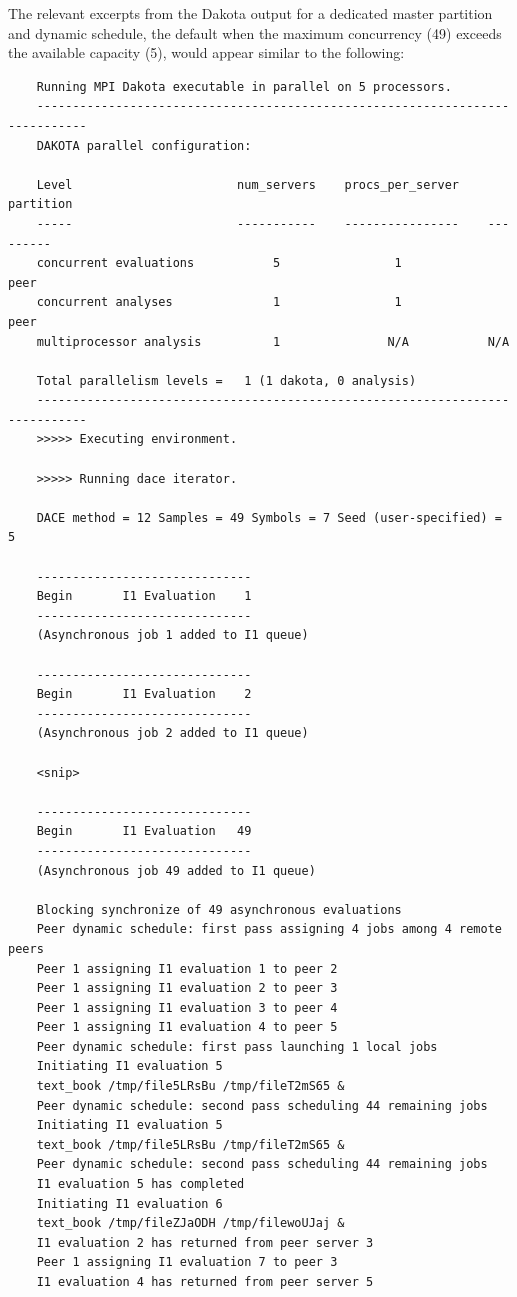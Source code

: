The relevant excerpts from the Dakota output for a dedicated master
partition and dynamic schedule, the default when the maximum concurrency
(49) exceeds the available capacity (5), would appear similar to the
following:
\begin{small}
\begin{verbatim}
    Running MPI Dakota executable in parallel on 5 processors.
    -----------------------------------------------------------------------------
    DAKOTA parallel configuration:
    
    Level                       num_servers    procs_per_server    partition
    -----                       -----------    ----------------    ---------
    concurrent evaluations           5                1            peer
    concurrent analyses	             1                1            peer
    multiprocessor analysis          1               N/A           N/A
    
    Total parallelism levels =   1 (1 dakota, 0 analysis)
    -----------------------------------------------------------------------------
    >>>>> Executing environment.
    
    >>>>> Running dace iterator.
    
    DACE method = 12 Samples = 49 Symbols = 7 Seed (user-specified) = 5
    
    ------------------------------
    Begin       I1 Evaluation    1
    ------------------------------
    (Asynchronous job 1 added to I1 queue)
    
    ------------------------------
    Begin       I1 Evaluation    2
    ------------------------------
    (Asynchronous job 2 added to I1 queue)
    
    <snip>
    
    ------------------------------
    Begin       I1 Evaluation   49
    ------------------------------
    (Asynchronous job 49 added to I1 queue)
    
    Blocking synchronize of 49 asynchronous evaluations
    Peer dynamic schedule: first pass assigning 4 jobs among 4 remote peers
    Peer 1 assigning I1 evaluation 1 to peer 2
    Peer 1 assigning I1 evaluation 2 to peer 3
    Peer 1 assigning I1 evaluation 3 to peer 4
    Peer 1 assigning I1 evaluation 4 to peer 5
    Peer dynamic schedule: first pass launching 1 local jobs
    Initiating I1 evaluation 5
    text_book /tmp/file5LRsBu /tmp/fileT2mS65 &
    Peer dynamic schedule: second pass scheduling 44 remaining jobs
    Initiating I1 evaluation 5
    text_book /tmp/file5LRsBu /tmp/fileT2mS65 &
    Peer dynamic schedule: second pass scheduling 44 remaining jobs
    I1 evaluation 5 has completed
    Initiating I1 evaluation 6
    text_book /tmp/fileZJaODH /tmp/filewoUJaj &
    I1 evaluation 2 has returned from peer server 3
    Peer 1 assigning I1 evaluation 7 to peer 3
    I1 evaluation 4 has returned from peer server 5
    

\end{verbatim}
\end{small}
